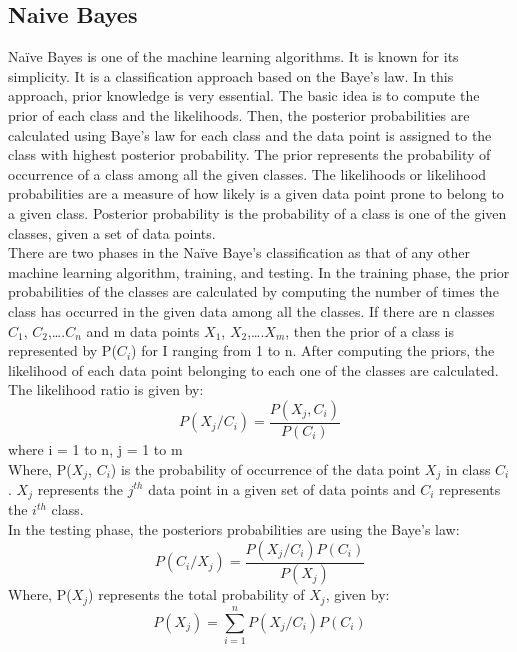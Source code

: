 \documentclass[sigconf]{acmart}
\begin{document}
\subsection{Naive Bayes}
Naïve Bayes is one of the machine learning algorithms. It is known for its simplicity. It is a classification approach based on the Baye’s law. In this approach, prior knowledge is very essential. The basic idea is to compute the prior of each class and the likelihoods. Then, the posterior probabilities are calculated using Baye’s law for each class and the data point is assigned to the class with highest posterior probability. The prior represents the probability of occurrence of a class among all the given classes. The likelihoods or likelihood probabilities are a measure of how likely is a given data point prone to belong to a given class. Posterior probability is the probability of a class is one of the given classes, given a set of data points.\cite{Crandall} \\
There are two phases in the Naïve Baye’s classification as that of any other machine learning algorithm, training, and testing.  In the training phase, the prior probabilities of the classes are calculated by computing the number of times the class has occurred in the given data among all the classes. If there are n classes $C_1$, $C_2$,….$C_n$ and m data points $X_1$, $X_2$,….$X_m$, then the prior of a class is represented by P($C_i$) for I ranging from 1 to n. After computing the priors, the likelihood of each data point belonging to each one of the classes are calculated. The likelihood ratio is given by:\cite{Crandall}\\
\begin{equation}
    P(X_j/C_i) = \frac{P(X_j, C_i)}{P(C_i)}
\end{equation}
where i = 1 to n, j = 1 to m\\
Where, P($X_j$, $C_i$) is the probability of occurrence of the data point $X_j$ in class $C_i$. $X_j$ represents the $j^{th}$ data point in a given set of data points and $C_i$ represents the $i^{th}$ class.\cite{Crandall}\\
In the testing phase, the posteriors probabilities are using the Baye’s law:
\begin{equation}
    P(C_i/X_j) = \frac{P(X_j/ C_i) P(C_i)}{P(X_j) }	
\end{equation}
Where, P($X_j$) represents the total probability of $X_j$, given by:
\begin{equation}
    P(X_j) = \sum_{i=1}^{n}P(X_j/ C_i)P(C_i)
\end{equation}
\end{document}
